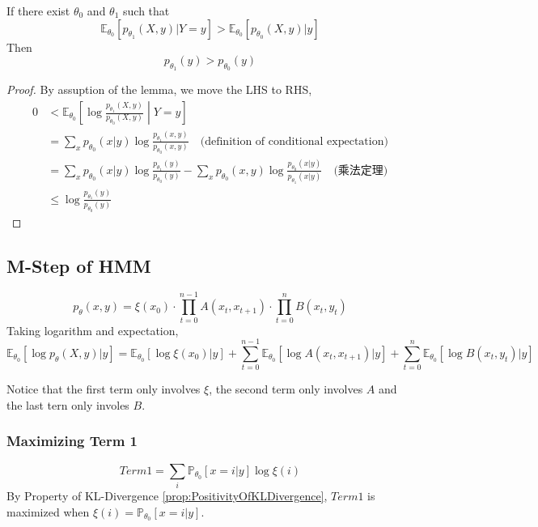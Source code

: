         \begin{lemma}\label{lem:IncreasingLowerBoundOfEMAlgo}
            If there exist $\theta_0$ and $\theta_1$ such that
            \[ \mathbb{E}_{\theta_0}[p_{\theta_1}(X,y)|Y=y] > \mathbb{E}_{\theta_0}[p_{\theta_0}(X,y)|y] \]
            Then
            \[ p_{\theta_1}(y) > p_{\theta_0}(y) \]
        \end{lemma}
        \begin{proof}
            By assuption of the lemma, we move the LHS to RHS,
            \begin{align*}
                0 &< \mathbb{E}_{\theta_0}\left[ \log \frac{p_{\theta_1}(X,y)}{p_{\theta_0}(X,y)} \middle\vert Y=y \right]\\
                &= \sum_x p_{\theta_0}(x|y) \log \frac{p_{\theta_1}(x,y)}{p_{\theta_0}(x,y)} \quad \text{(definition of conditional expectation)}\\
                &= \sum_x p_{\theta_0}(x|y) \log \frac{p_{\theta_1}(y)}{p_{\theta_0}(y)} - \sum_x p_{\theta_0}(x,y)\log\frac{p_{\theta_0}(x|y)}{p_{\theta_1}(x|y)} \quad \text{(乘法定理)} \\
                &\le \log\frac{p_{\theta_1}(y)}{p_{\theta_0}(y)}
            \end{align*}
        \end{proof}

    \subsection{M-Step of HMM}
        \[ p_{\theta}(x,y) = \xi(x_0) \cdot \prod_{t=0}^{n-1}A(x_t,x_{t+1}) \cdot \prod_{t=0}^n B(x_t, y_t) \]
        Taking logarithm and expectation,
        \[ \mathbb{E}_{\theta_0}\left[ \log p_{\theta}(X,y)|y \right] = \mathbb{E}_{\theta_0}[\log\xi(x_0)|y] + \sum_{t=0}^{n-1}\mathbb{E}_{\theta_0}[\log A(x_t,x_{t+1})|y] + \sum_{t=0}^n\mathbb{E}_{\theta_0}[\log B(x_t,y_t)|y] \]

        Notice that the first term only involves $\xi$, the second term only involves $A$ and the last tern only involes $B$.

        \subsubsection{Maximizing Term 1}
        \[ Term1 = \sum_i \mathbb{P}_{\theta_0}[x=i|y]\log\xi(i) \]
        By Property of KL-Divergence \ref{prop:PositivityOfKLDivergence}, $Term1$ is maximized when $\xi(i) = \mathbb{P}_{\theta_0}[x=i|y]$.

